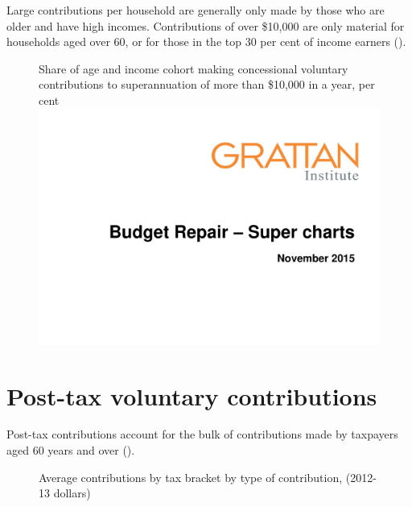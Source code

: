 \begin{subappendices}
\begin{figure}
\end{figure}

Large contributions per household are generally only made by those who are older and have high incomes. Contributions of over 
\$10,000 are only material for households aged over 60, or for those in the top 30 per cent of income earners (). 

\begin{figure}
%
{Share of age and income cohort making concessional voluntary contributions to superannuation of more than \$10,000 in a year, per cent}\label{fig:SUPER-A-7}
\includegraphics[width=\columnwidth,page=41]{super-atlas/PPTX.pdf}
\end{figure}

\section{Post-tax voluntary contributions}
Post-tax contributions account for the bulk of contributions made by taxpayers aged 60 years and over (). 
\begin{figure}
%
{Average contributions by tax bracket by type of contribution, (2012-13 dollars)}\label{fig:SUPER-A-8}
\end{figure}


\end{subappendices}
